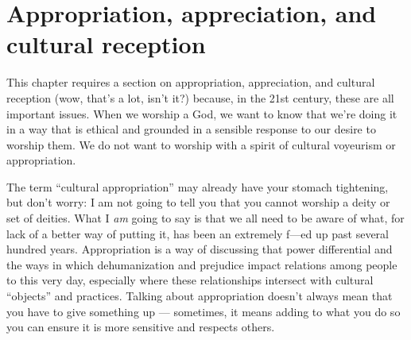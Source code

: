 \documentclass[
]{book}
\begin{document}
\hypertarget{appropriation-appreciation-and-cultural-reception}{%
\section{Appropriation, appreciation, and cultural reception}\label{appropriation-appreciation-and-cultural-reception}}

This chapter requires a section on appropriation, appreciation, and cultural reception (wow, that's a lot, isn't it?) because, in the 21st century, these are all important issues. When we worship a God, we want to know that we're doing it in a way that is ethical and grounded in a sensible response to our desire to worship them. We do not want to worship with a spirit of cultural voyeurism or appropriation.

The term ``cultural appropriation'' may already have your stomach tightening, but don't worry: I am not going to tell you that you cannot worship a deity or set of deities. What I \emph{am} going to say is that we all need to be aware of what, for lack of a better way of putting it, has been an extremely f---ed up past several hundred years. Appropriation is a way of discussing that power differential and the ways in which dehumanization and prejudice impact relations among people to this very day, especially where these relationships intersect with cultural ``objects'' and practices. Talking about appropriation doesn't always mean that you have to give something up --- sometimes, it means adding to what you do so you can ensure it is more sensitive and respects others.
\end{document}
